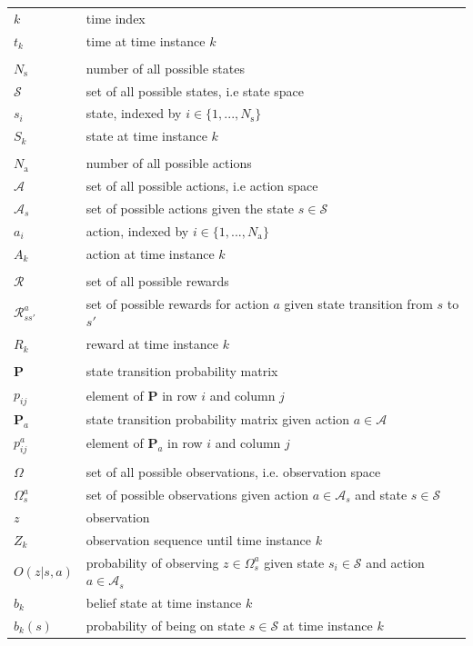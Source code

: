 \documentclass[english, 12pt, a4paper, elec, utf8, a-1b, online]{aaltothesis}
\renewcommand{\vec}[1]{\mathbf{#1}}
\newcommand{\Ss}{\mathcal{S}}
\newcommand{\As}{\mathcal{A}}
\newcommand{\Rs}{\mathcal{R}}
\newcommand{\Os}{\Omega}
\newcommand{\Op}{O}
\newcommand{\stprobs}{\vec{P}}
\newcommand{\nacts}{{N_\text{a}}}
\newcommand{\nstates}{{N_\text{s}}}
\begin{document}
\begin{longtable}{ll}
$k$ & time index \\
$t_k$ & time at time instance $k$ \\
&\\
$\nstates$ & number of all possible states \\
$\Ss$ & set of all possible states, i.e state space \\
$s_i$ & state, indexed by $i \in \{1, ..., \nstates\}$ \\
$S_k$ & state at time instance $k$ \\
&\\
$\nacts$ & number of all possible actions \\
$\As$ & set of all possible actions, i.e action space \\
$\As_s$ & set of possible actions given the state $s \in \Ss$ \\
$a_i$ & action, indexed by $i \in \{1, ..., \nacts\}$ \\
$A_k$ & action at time instance $k$ \\
&\\
$\Rs$ & set of all possible rewards \\
$\Rs_{ss'}^a$ & set of possible rewards for action $a$ given state transition from $s$ to $s'$ \\
$R_k$ & reward at time instance $k$ \\
&\\
$\stprobs$ & state transition probability matrix \\
$p_{ij}$ & element of $\stprobs$ in row $i$ and column $j$ \\
$\stprobs_a$ & state transition probability matrix given action $a \in \As$ \\
$p_{ij}^a$ & element of $\stprobs_a$ in row $i$ and column $j$ \\
&\\
$\Os$ & set of all possible observations, i.e. observation space \\
$\Os_s^a$ & set of possible observations given action $a \in \As_s$ and state $s \in \Ss $ \\
$z$ & observation \\
$Z_k$ & observation sequence until time instance $k$ \\
$\Op(z | s, a)$ & probability of observing $z \in \Os_s^a$ given state $s_i \in \Ss$ and action $a \in \As_s$ \\
$b_k$ & belief state at time instance $k$ \\
$b_k(s)$ & probability of being on state $s \in \Ss$ at time instance $k$ \\


\end{longtable}
\end{document}
